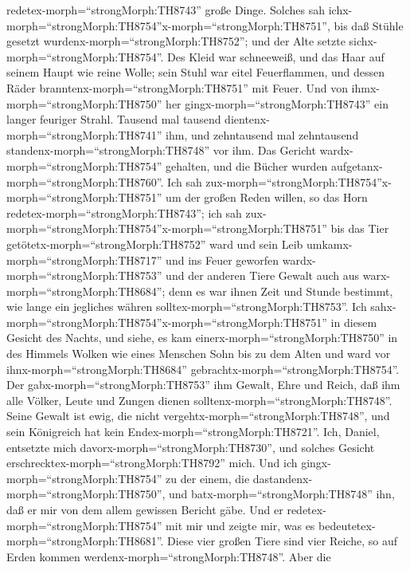 redetex-morph=``strongMorph:TH8743'' große Dinge.  Solches
sah ichx-morph=``strongMorph:TH8754''x-morph=``strongMorph:TH8751'', bis
daß Stühle gesetzt wurdenx-morph=``strongMorph:TH8752''; und der Alte
setzte sichx-morph=``strongMorph:TH8754''. Des Kleid war schneeweiß, und
das Haar auf seinem Haupt wie reine Wolle; sein Stuhl war eitel
Feuerflammen, und dessen Räder branntenx-morph=``strongMorph:TH8751''
mit Feuer.  Und von ihmx-morph=``strongMorph:TH8750'' her
gingx-morph=``strongMorph:TH8743'' ein langer feuriger Strahl. Tausend
mal tausend dientenx-morph=``strongMorph:TH8741'' ihm, und zehntausend
mal zehntausend standenx-morph=``strongMorph:TH8748'' vor ihm. Das
Gericht wardx-morph=``strongMorph:TH8754'' gehalten, und die Bücher
wurden aufgetanx-morph=``strongMorph:TH8760''.  Ich sah
zux-morph=``strongMorph:TH8754''x-morph=``strongMorph:TH8751'' um der
großen Reden willen, so das Horn redetex-morph=``strongMorph:TH8743'';
ich sah zux-morph=``strongMorph:TH8754''x-morph=``strongMorph:TH8751''
bis das Tier getötetx-morph=``strongMorph:TH8752'' ward und sein Leib
umkamx-morph=``strongMorph:TH8717'' und ins Feuer geworfen
wardx-morph=``strongMorph:TH8753''  und der anderen Tiere
Gewalt auch aus warx-morph=``strongMorph:TH8684''; denn es war ihnen
Zeit und Stunde bestimmt, wie lange ein jegliches währen
solltex-morph=``strongMorph:TH8753''.  Ich
sahx-morph=``strongMorph:TH8754''x-morph=``strongMorph:TH8751'' in
diesem Gesicht des Nachts, und siehe, es kam
einerx-morph=``strongMorph:TH8750'' in des Himmels Wolken wie eines
Menschen Sohn bis zu dem Alten und ward vor
ihnx-morph=``strongMorph:TH8684''
gebrachtx-morph=``strongMorph:TH8754''.  Der
gabx-morph=``strongMorph:TH8753'' ihm Gewalt, Ehre und Reich, daß ihm
alle Völker, Leute und Zungen dienen
solltenx-morph=``strongMorph:TH8748''. Seine Gewalt ist ewig, die nicht
vergehtx-morph=``strongMorph:TH8748'', und sein Königreich hat kein
Endex-morph=``strongMorph:TH8721''.  Ich, Daniel, entsetzte
mich davorx-morph=``strongMorph:TH8730'', und solches Gesicht
erschrecktex-morph=``strongMorph:TH8792'' mich.  Und ich
gingx-morph=``strongMorph:TH8754'' zu der einem, die
dastandenx-morph=``strongMorph:TH8750'', und
batx-morph=``strongMorph:TH8748'' ihn, daß er mir von dem allem gewissen
Bericht gäbe. Und er redetex-morph=``strongMorph:TH8754'' mit mir und
zeigte mir, was es bedeutetex-morph=``strongMorph:TH8681''.
 Diese vier großen Tiere sind vier Reiche, so auf Erden
kommen werdenx-morph=``strongMorph:TH8748''.  Aber die

